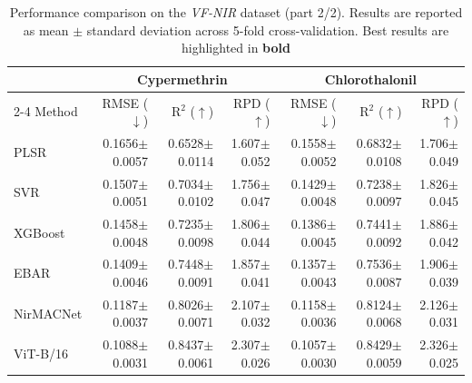 \documentclass[pdflatex,sn-mathphys-num]{sn-jnl}%
\begin{document}
\begin{table}
\caption{Performance comparison on the \textit{VF-NIR} dataset (part 2/2). Results are reported as mean $\pm$ standard deviation across 5-fold cross-validation. Best results are highlighted in \textbf{bold}}
\label{tab:VF-NIR-results-2}
\begin{tabular*}{\textheight}{@{\extracolsep\fill}lrrrrrr}

\toprule
& \multicolumn{3}{c}{Cypermethrin} & \multicolumn{3}{c}{Chlorothalonil} \\
\cmidrule{2-4}\cmidrule{5-7}
Method &
RMSE ($\downarrow$) & $\text{R}^2$ ($\uparrow$) & RPD ($\uparrow$) &
RMSE ($\downarrow$) & $\text{R}^2$ ($\uparrow$) & RPD ($\uparrow$) \\
\midrule

PLSR &
0.1656{\scriptsize$\pm$0.0057} & 0.6528{\scriptsize$\pm$0.0114} & 1.607{\scriptsize$\pm$0.052} &
0.1558{\scriptsize$\pm$0.0052} & 0.6832{\scriptsize$\pm$0.0108} & 1.706{\scriptsize$\pm$0.049} \\

SVR &
0.1507{\scriptsize$\pm$0.0051} & 0.7034{\scriptsize$\pm$0.0102} & 1.756{\scriptsize$\pm$0.047} &
0.1429{\scriptsize$\pm$0.0048} & 0.7238{\scriptsize$\pm$0.0097} & 1.826{\scriptsize$\pm$0.045} \\

XGBoost &
0.1458{\scriptsize$\pm$0.0048} & 0.7235{\scriptsize$\pm$0.0098} & 1.806{\scriptsize$\pm$0.044} &
0.1386{\scriptsize$\pm$0.0045} & 0.7441{\scriptsize$\pm$0.0092} & 1.886{\scriptsize$\pm$0.042} \\

EBAR \cite{phan2025ebar} &
0.1409{\scriptsize$\pm$0.0046} & 0.7448{\scriptsize$\pm$0.0091} & 1.857{\scriptsize$\pm$0.041} &
0.1357{\scriptsize$\pm$0.0043} & 0.7536{\scriptsize$\pm$0.0087} & 1.906{\scriptsize$\pm$0.039} \\

\midrule

NirMACNet \cite{phuong2025nirmacnet} &
0.1187{\scriptsize$\pm$0.0037} & 0.8026{\scriptsize$\pm$0.0071} & 2.107{\scriptsize$\pm$0.032} &
0.1158{\scriptsize$\pm$0.0036} & 0.8124{\scriptsize$\pm$0.0068} & 2.126{\scriptsize$\pm$0.031} \\

ViT-B/16 \cite{dosovitskiy2021image} &
0.1088{\scriptsize$\pm$0.0031} & 0.8437{\scriptsize$\pm$0.0061} & 2.307{\scriptsize$\pm$0.026} &
0.1057{\scriptsize$\pm$0.0030} & 0.8429{\scriptsize$\pm$0.0059} & 2.326{\scriptsize$\pm$0.025} \\


\end{tabular*}
\end{table}
\end{document}
